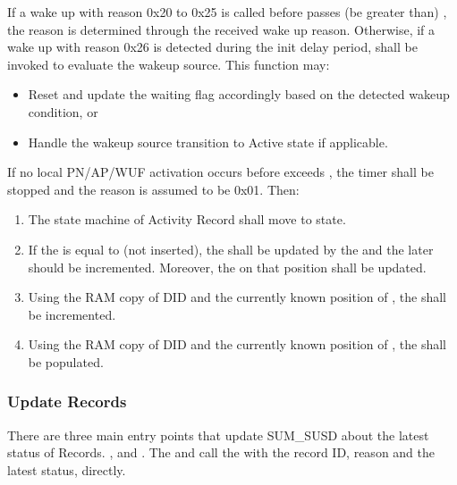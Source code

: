 {If a wake up with reason 0x20 to 0x25 is called before  passes (be greater than) , the reason is determined through the received wake up reason.
Otherwise, if a wake up with reason 0x26 is detected during the init delay period,  shall be invoked to evaluate the wakeup source. This function may:
\begin{itemize}
\item Reset  and update the waiting flag  accordingly based on the detected wakeup condition, or
\item Handle the wakeup source transition to Active state if applicable.
\end{itemize}
If no local PN/AP/WUF activation occurs before  exceeds , the timer shall be stopped and the reason is assumed to be 0x01. Then:
\begin{enumerate}
\item The state machine of Activity Record shall move to  state.
\item If the  is equal to  (not inserted), the  shall be updated by the  and the later should be incremented. Moreover, the  on that position shall be updated.
\item Using the RAM copy of DID and the currently known position of , the  shall be incremented.
\item Using the RAM copy of DID and the currently known position of , the  shall be populated.
\end{enumerate}
}
{ }



\subsubsection{Update Records} \label{subsec:update_record}

{There are three main entry points that update SUM_SUSD about the latest status of Records.
,  and .
The  and  call the  with the record ID, reason and the latest status, directly.
}
{  }

